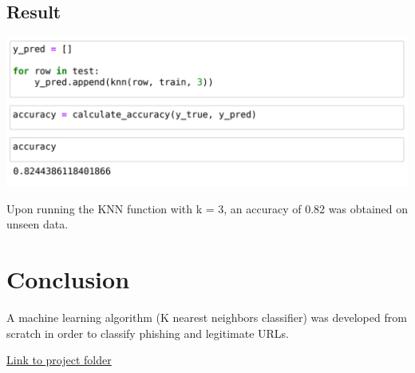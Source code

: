 \documentclass[letterpaper, 28pt, fleqn]{article}
\begin{document}
\begin{multicols}{2}

\subsection{Result}

\begin{Figure}
  \includegraphics[width=\linewidth]{impl6.png}
\end{Figure}

Upon running the KNN function with k = 3, an accuracy of 0.82 was obtained on unseen data. 

\section{Conclusion}

A machine learning algorithm (K nearest neighbors classifier) was developed from scratch in order to classify phishing and legitimate URLs. 

\href{https://amritauniv-my.sharepoint.com/:f:/g/personal/yadhukrishna_am_students_amrita_edu/ErRa1KKzBQROssk2Y6KyZmoBZmovAkmMdeOQCI79fXT4pQ}{Link to project folder} 

\end{multicols}
\end{document}
